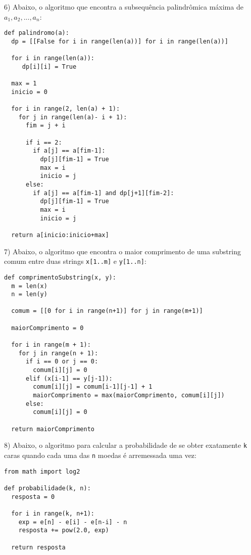 \documentclass[]{article}
\begin{document}
\newpage

6) Abaixo, o algoritmo que encontra a subsequência palindrômica máxima de $a_1, a_2, ..., a_n$:

\begin{lstlisting}
def palindromo(a):
  dp = [[False for i in range(len(a))] for i in range(len(a))]
  
  for i in range(len(a)):
     dp[i][i] = True
     
  max = 1
  inicio = 0
  
  for i in range(2, len(a) + 1):
    for j in range(len(a)- i + 1):
      fim = j + i
        
      if i == 2:
        if a[j] == a[fim-1]:
          dp[j][fim-1] = True
          max = i
          inicio = j
      else:
        if a[j] == a[fim-1] and dp[j+1][fim-2]:
          dp[j][fim-1] = True
          max = i
          inicio = j

  return a[inicio:inicio+max]
\end{lstlisting}

\newpage

7) Abaixo, o algoritmo que encontra o maior comprimento de uma substring comum entre duas strings \texttt{x[1..m]} e \texttt{y[1..n]}:

\begin{lstlisting}
def comprimentoSubstring(x, y):
  m = len(x)
  n = len(y)
  
  comum = [[0 for i in range(n+1)] for j in range(m+1)]

  maiorComprimento = 0

  for i in range(m + 1):
    for j in range(n + 1):
      if i == 0 or j == 0:
        comum[i][j] = 0
      elif (x[i-1] == y[j-1]):
        comum[i][j] = comum[i-1][j-1] + 1
        maiorComprimento = max(maiorComprimento, comum[i][j])
      else:
        comum[i][j] = 0

  return maiorComprimento
\end{lstlisting}

\newpage

8) Abaixo, o algoritmo para calcular a probabilidade de se obter exatamente \texttt{k} caras quando cada uma das \texttt{n} moedas é arremessada uma vez:

\begin{lstlisting}
from math import log2 

def probabilidade(k, n):
  resposta = 0
  
  for i in range(k, n+1):
    exp = e[n] - e[i] - e[n-i] - n 
    resposta += pow(2.0, exp)
    
  return resposta
\end{lstlisting}
\end{document}
